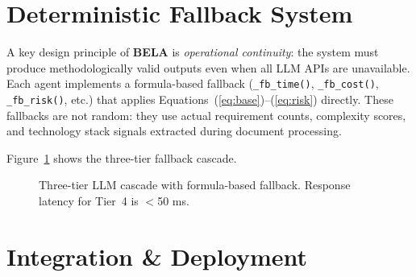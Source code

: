 \documentclass[10pt,twocolumn]{article}
\newcommand{\bela}{\textbf{BELA}}
\newcommand{\code}[1]{\texttt{\small #1}}
\begin{document}
\section{Deterministic Fallback System}
\label{sec:fallback}

A key design principle of \bela{} is \textit{operational continuity}:
the system must produce methodologically valid outputs even when all LLM
APIs are unavailable. Each agent implements a formula-based fallback
(\code{\_fb\_time()}, \code{\_fb\_cost()}, \code{\_fb\_risk()}, etc.) that
applies Equations~(\ref{eq:base})–(\ref{eq:risk}) directly. These fallbacks
are not random: they use actual requirement counts, complexity scores, and
technology stack signals extracted during document processing.

Figure~\ref{fig:fallback} shows the three-tier fallback cascade.

\begin{figure}[H]
\centering
{}
\caption{Three-tier LLM cascade with formula-based fallback.
Response latency for Tier~4 is $<$50 ms.}
\label{fig:fallback}
\end{figure}

\section{Integration \& Deployment}
\label{sec:deployment}
\end{document}
